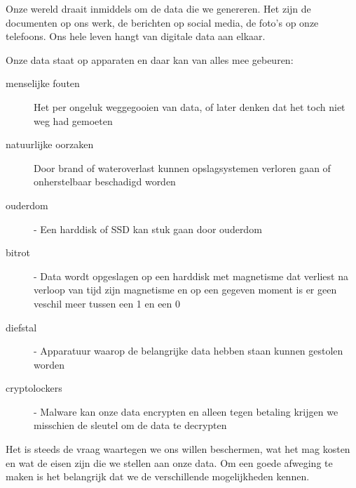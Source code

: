 Onze wereld draait inmiddels om de data die we genereren. Het zijn de documenten op ons werk, de berichten op social media, de foto's op onze telefoons. Ons hele leven hangt van digitale data aan elkaar.

Onze data staat op apparaten en daar kan van alles mee gebeuren:
\begin{description}
\item [menselijke fouten] Het per ongeluk weggegooien van data, of later denken dat het toch niet weg had gemoeten
\item [natuurlijke oorzaken] Door brand of wateroverlast kunnen opslagsystemen verloren gaan of onherstelbaar beschadigd worden
\item [ouderdom] - Een harddisk of SSD kan stuk gaan door ouderdom
\item [bitrot] - Data wordt opgeslagen op een harddisk met magnetisme dat verliest na verloop van tijd zijn magnetisme en op een gegeven moment is er geen veschil meer tussen een 1 en een 0
\item [diefstal] - Apparatuur waarop de belangrijke data hebben staan kunnen gestolen worden
\item [cryptolockers] - Malware kan onze data encrypten en alleen tegen betaling krijgen we misschien de sleutel om de data te decrypten
\end{description}

Het is steeds de vraag waartegen we ons willen beschermen, wat het mag kosten en wat de eisen zijn die we stellen aan onze data. Om een goede afweging te maken is het belangrijk dat we de verschillende mogelijkheden kennen.

